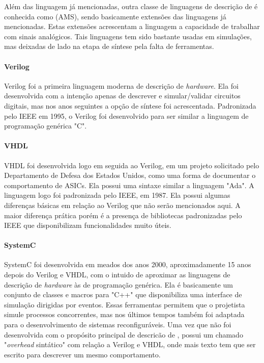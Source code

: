 \documentclass[11pt,a4paper,oneside]{book}
\begin{document}
Al\'em das linguagem j\'a mencionadas, outra classe de linguagens de descri\c{c}\~ao de  \'e conhecida como  (AMS), sendo basicamente extens\~oes das linguagens j\'a mencionadas.
Estas extens\~oes acrescentam a linguagem a capacidade de trabalhar com sinais anal\'ogicos.
Tais linguagens tem sido bastante usadas em simula\c{c}\~oes, mas deixadas de lado na etapa de s\'i­ntese pela falta de ferramentas.


\paragraph{Verilog}
Verilog foi a primeira linguagem moderna de descri\c{c}\~ao de \textit{hardware}.
Ela foi desenvolvida com a inten\c{c}\~ao apenas de descrever e simular/validar circuitos digitais, mas nos anos seguintes a op\c{c}\~ao de s\'i­ntese foi acrescentada.
Padronizada pelo IEEE em 1995, o Verilog foi desenvolvido para ser similar a linguagem de programa\c{c}\~ao gen\'erica "C".


\paragraph{VHDL}
VHDL foi desenvolvida logo em seguida ao Verilog, em um projeto solicitado pelo Departamento de Defesa dos Estados Unidos, como uma forma de documentar o comportamento de ASICs.
Ela possui uma sintaxe similar a linguagem "Ada".
A linguagem logo foi padronizada pelo IEEE, em 1987.
Ela possui algumas diferen\c{c}as b\'asicas em rela\c{c}\~ao ao Verilog que n\~ao ser\~ao mencionados aqui.
A maior diferen\c{c}a pr\'atica por\'em \'e a presen\c{c}a de bibliotecas padronizadas pelo IEEE que disponibilizam funcionalidades muito \'uteis.


\paragraph{SystemC}
SystemC foi desenvolvida em meados dos anos 2000, aproximadamente 15 anos depois do Verilog e VHDL, com o intuido de aproximar as linguagens de descri\c{c}\~ao de \textit{hardware} \`as de programa\c{c}\~ao gen\'erica.
Ela \'e basicamente um conjunto de classes e macros para "C++" que disponibiliza uma interface de simula\c{c}\~ao dirigidas por eventos.
Essas ferramentas permitem que o projetista simule processos concorrentes, mas nos \'ultimos tempos tamb\'em foi adaptada para o desenvolvimento de sistemas reconfigur\'aveis.
Uma vez que n\~ao foi desenvolvida com o prop\'osito principal de descric\~ao de , possui um chamado "\textit{overhead} sint\'atico" com rela\c{c}\~ao a Verilog e VHDL, onde mais texto tem que ser escrito para descrever um mesmo comportamento.
\end{document}

